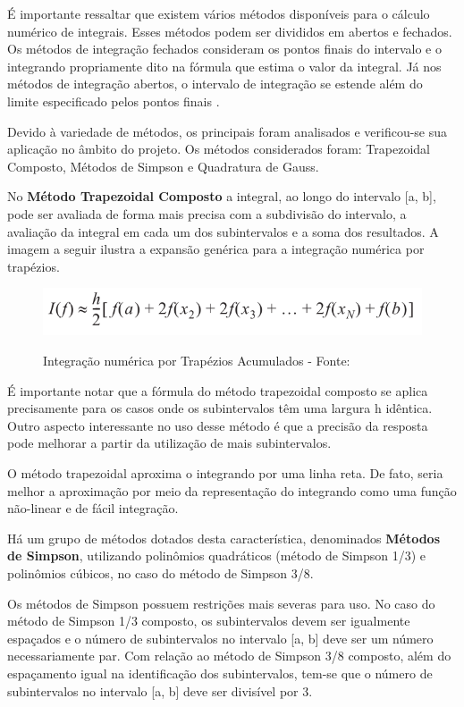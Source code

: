 É importante ressaltar que existem vários métodos disponíveis para o cálculo numérico de integrais. Esses métodos podem ser divididos em abertos 
e fechados. Os métodos de integração fechados consideram os pontos finais do intervalo e o integrando propriamente dito na fórmula que estima o
valor da integral. Já nos métodos de integração abertos, o intervalo de integração se estende além do limite especificado pelos pontos finais 
\cite{metodos_numericos}.

Devido à variedade de métodos, os principais foram analisados e verificou-se sua aplicação no âmbito do projeto. Os métodos considerados foram: 
Trapezoidal Composto, Métodos de Simpson e Quadratura de Gauss.

No {\textbf{Método Trapezoidal Composto}} a integral, ao longo do intervalo [a, b], pode ser avaliada de forma mais precisa com a subdivisão do 
intervalo, a avaliação da integral em cada um dos subintervalos e a soma dos resultados. A imagem a seguir ilustra a expansão genérica para a 
integração numérica por trapézios.

\begin{figure}[H]
\centering
\includegraphics[keepaspectratio=true,scale=0.52]	{figuras/metodo_trapezoidal.png}
\label{fig:metodo_trapezoidal}
\caption{Integração numérica por Trapézios Acumulados - Fonte: }
\end{figure}

É importante notar que a fórmula do método trapezoidal composto se aplica precisamente para os casos onde os subintervalos têm uma largura h
idêntica. Outro aspecto interessante no uso desse método é que a precisão da resposta pode melhorar a partir da utilização de mais subintervalos.

O método trapezoidal aproxima o integrando por uma linha reta. De fato, seria melhor a aproximação por meio da representação do integrando 
como uma função não-linear e de fácil integração.

Há um grupo de métodos dotados desta característica, denominados \textbf{Métodos de Simpson}, utilizando polinômios quadráticos (método de
Simpson 1/3) e polinômios cúbicos, no caso do método de Simpson 3/8.

Os métodos de Simpson possuem restrições mais severas para uso. No caso do método de Simpson 1/3 composto, os subintervalos devem ser 
igualmente espaçados e o número de subintervalos no intervalo [a, b] deve ser um número necessariamente par. Com relação ao método de Simpson 
3/8 composto, além do espaçamento igual na identificação dos subintervalos, tem-se que o número de subintervalos no intervalo [a, b] deve ser 
divisível por 3.

